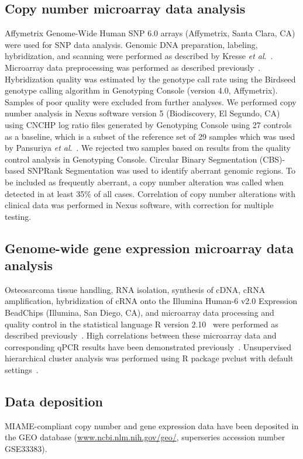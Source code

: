 \subsection{Copy number microarray data analysis}
Affymetrix Genome\hyp{}Wide Human SNP 6.0
arrays (Affymetrix, Santa Clara, CA) were used
for SNP data analysis. Genomic DNA preparation,
labeling, hybridization, and scanning were
performed as described by Kresse {\it et al}.~\cite{kresse2010evaluation}.
Microarray data preprocessing was performed as
described previously~\cite{pansuriya2011genome}.
Hybridization quality was estimated by the genotype
call rate using the Birdseed genotype calling
algorithm in Genotyping Console (version 4.0,
Affymetrix). Samples of poor quality were
excluded from further analyses. We performed
copy number analysis in Nexus software version
5 (Biodiscovery, El Segundo, CA) using CNCHP
log ratio files generated by Genotyping Console
using 27 controls as a baseline, which is a subset
of the reference set of 29 samples which was
used by Pansuriya {\it et al}.~\cite{pansuriya2011genome}. We rejected two
samples based on results from the quality control
analysis in Genotyping Console. Circular Binary Segmentation (CBS)\hyp{}based SNPRank Segmentation
was used to identify aberrant genomic
regions. To be included as frequently aberrant, a
copy number alteration was called when detected
in at least 35\% of all cases. Correlation of copy
number alterations with clinical data was performed
in Nexus software, with correction for
multiple testing.

\subsection{Genome\hyp{}wide gene expression microarray data analysis}
Osteosarcoma tissue handling, RNA isolation,
synthesis of cDNA, cRNA amplification, hybridization
of cRNA onto the Illumina Human-6 v2.0
Expression BeadChips (Illumina, San Diego,
CA), and microarray data processing and quality
control in the statistical language R version 2.10~\cite{r2.10.0}
were performed
as described previously~\cite{buddingh2011tumor}.
High correlations between these microarray
data and corresponding qPCR results have
been demonstrated previously~\cite{buddingh2011tumor}.
Unsupervised hierarchical cluster analysis
was performed using R package pvclust with
default settings~\cite{suzuki2006pvclust}.

\subsection{Data deposition}
MIAME\hyp{}compliant copy number and gene
expression data have been deposited in the GEO
database (\url{www.ncbi.nlm.nih.gov/geo/}, superseries
accession number GSE33383).

